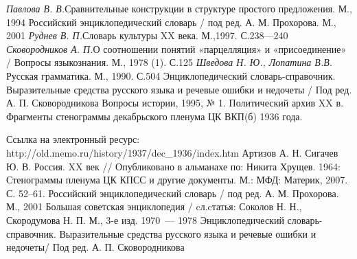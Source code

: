 \textit{Павлова В. В.}Сравнительные конструкции в структуре простого предложения. М., 1994
Российский энциклопедический словарь / под ред. А. М. Прохорова. М., 2001 
\textit{Руднев В. П.}Словарь культуры XX века. М.,1997. С.238—240 
\textit{Сковородников А. П.}О соотношении понятий «парцелляция» и «присоединение» / Вопросы языкознания. М., 1978 (1). С.125
\textit{Шведова Н. Ю., Лопатина В.В. }Русская грамматика. М., 1990. С.504
Энциклопедический словарь-справочник. Выразительные средства русского языка и речевые ошибки и недочеты / Под ред. А. П. Сковородникова
Вопросы истории, 1995, № 1. Политический архив XX в. Фрагменты стенограммы декабрьского пленума ЦК ВКП(б) 1936 года.\par Ссылка на электронный ресурс: http://old.memo.ru/history/1937/dec\_1936/index.htm
Артизов А. Н. Сигачев Ю. В. Россия. XX век // Опубликовано в альманахе по: Никита Хрущев. 1964: Стенограммы пленума ЦК КПСС и другие документы. М.: МФД: Материк, 2007. С. 52–61.
Российский энциклопедический словарь / под ред. А. М. Прохорова. М., 2001 
Большая советская энциклопедия / cл.cтатья: Соколов Н. Н., Скородумова Н. П. М., 3-е изд. 1970~--- 1978
Энциклопедический словарь-справочник. Выразительные средства русского языка и речевые ошибки и недочеты/ Под ред. А. П. Сковородникова
